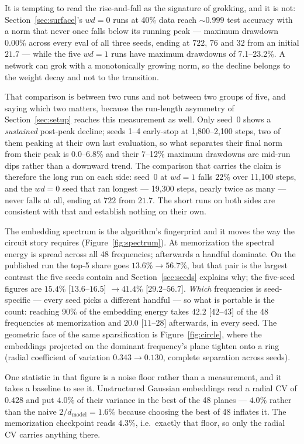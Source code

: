 \documentclass[11pt]{article}
\begin{document}
It is tempting to read the rise-and-fall as the signature of grokking, and it is
not: Section~\ref{sec:surface}'s $wd = 0$ runs at 40\% data reach
${\sim}0.999$ test accuracy with a norm that never once falls below its running
peak --- maximum drawdown $0.00\%$ across every eval of all three seeds,
ending at $722$, $76$ and $32$ from an initial $21.7$ --- while the five
$wd = 1$ runs have maximum drawdowns of 7.1--23.2\%. A network can grok with a
monotonically growing norm, so the decline belongs to the weight decay and not
to the transition.

That comparison is between two runs and not between two groups of five, and
saying which two matters, because the run-length asymmetry of
Section~\ref{sec:setup} reaches this measurement as well. Only seed~0 shows a
\emph{sustained} post-peak decline; seeds 1--4 early-stop at 1{,}800--2{,}100
steps, two of them peaking at their own last evaluation, so what separates
their final norm from their peak is 0.0--6.8\% and their 7--12\% maximum
drawdowns are mid-run dips rather than a downward trend. The comparison that
carries the claim is therefore the long run on each side: seed~0 at $wd = 1$
falls $22\%$ over 11{,}100 steps, and the $wd = 0$ seed that ran longest ---
19{,}300 steps, nearly twice as many --- never falls at all, ending at $722$
from $21.7$. The short runs on both sides are consistent with that and
establish nothing on their own.

The embedding spectrum is the algorithm's fingerprint and it moves the way the
circuit story requires (Figure~\ref{fig:spectrum}). At memorization the
spectral energy is spread across all 48 frequencies; afterwards a handful
dominate. On the published run the top-5 share goes $13.6\% \to 56.7\%$, but
that pair is the largest contrast the five seeds contain and
Section~\ref{sec:seeds} explains why; the five-seed figures are
$15.4\%$ [$13.6$--$16.5$] $\to 41.4\%$ [$29.2$--$56.7$]. \emph{Which}
frequencies is seed-specific --- every seed picks a different handful --- so
what is portable is the count: reaching 90\% of the embedding energy takes
$42.2$ [$42$--$43$] of the 48 frequencies at memorization and $20.0$
[$11$--$28$] afterwards, in every seed. The geometric face of the same
sparsification is Figure~\ref{fig:circle}, where the embeddings projected on
the dominant frequency's plane tighten onto a ring (radial coefficient of
variation $0.343 \to 0.130$, complete separation across seeds).

One statistic in that figure is a noise floor rather than a measurement, and it
takes a baseline to see it. Unstructured Gaussian embeddings read a radial CV
of $0.428$ and put $4.0\%$ of their variance in the best of the 48 planes ---
$4.0\%$ rather than the naive $2/d_{\text{model}} = 1.6\%$ because choosing
the best of 48 inflates it. The memorization checkpoint reads $4.3\%$, i.e.\
exactly that floor, so only the radial CV carries anything there.
\end{document}
